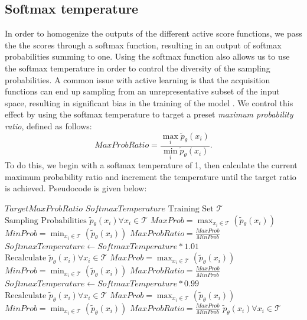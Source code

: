  \subsection{Softmax temperature}\label{Methods_SoftmaxTemperature}
In order to homogenize the outputs of the different active score functions, we pass the the scores through a softmax function, resulting in an output of softmax probabilities summing to one. Using the softmax function also allows us to use the softmax temperature in order to control the diversity of the sampling probabilities. A common issue with active learning is that the acquisition functions can end up sampling from an unrepresentative subset of the input space, resulting in significant bias in the training of the model \cite{settles2012active}. We control this effect by using the softmax temperature to target a preset \textit{maximum probability ratio}, defined as follows:
\begin{equation}
MaxProbRatio = \frac{\max_{i} \tilde{p}_\theta(x_i)}{\min_{i} \tilde{p}_\theta(x_i)}.
\end{equation}
To do this, we begin with a softmax temperature of 1, then calculate the current maximum probability ratio and increment the temperature until the target ratio is achieved. Pseudocode is given below:
\begin{algorithmic}
\REQUIRE $TargetMaxProbRatio$
\REQUIRE $SoftmaxTemperature$
\REQUIRE $\text{Training Set }\mathcal{T}$
\REQUIRE $\text{Sampling Probabilities } \tilde{p}_\theta(x_i) \forall x_i \in \mathcal{T}$
\STATE $MaxProb = \max_{x_i \in \mathcal{T}} (\tilde{p}_\theta(x_i)) $
\STATE $MinProb = \min_{x_i \in \mathcal{T}} (\tilde{p}_\theta(x_i)) $
\STATE $MaxProbRatio = \frac{MaxProb}{MinProb}$
\STATE $SoftmaxTemperature \leftarrow SoftmaxTemperature*1.01$
\STATE $\text{Recalculate } \tilde{p}_\theta(x_i) \forall x_i \in \mathcal{T}$
\STATE $MaxProb = \max_{x_i \in \mathcal{T}} (\tilde{p}_\theta(x_i)) $
\STATE $MinProb = \min_{x_i \in \mathcal{T}} (\tilde{p}_\theta(x_i)) $
\STATE $MaxProbRatio = \frac{MaxProb}{MinProb}$
\ENDWHILE
\ELSE
{}
\STATE $SoftmaxTemperature \leftarrow SoftmaxTemperature*0.99$
\STATE $\text{Recalculate } \tilde{p}_\theta(x_i) \forall x_i \in \mathcal{T}$
\STATE $MaxProb = \max_{x_i \in \mathcal{T}} (\tilde{p}_\theta(x_i)) $
\STATE $MinProb = \min_{x_i \in \mathcal{T}} (\tilde{p}_\theta(x_i)) $
\STATE $MaxProbRatio = \frac{MaxProb}{MinProb}$
\ENDWHILE
\ENDIF
\RETURN $\tilde{p}_\theta(x_i) \forall x_i \in \mathcal{T}$
\end{algorithmic}

